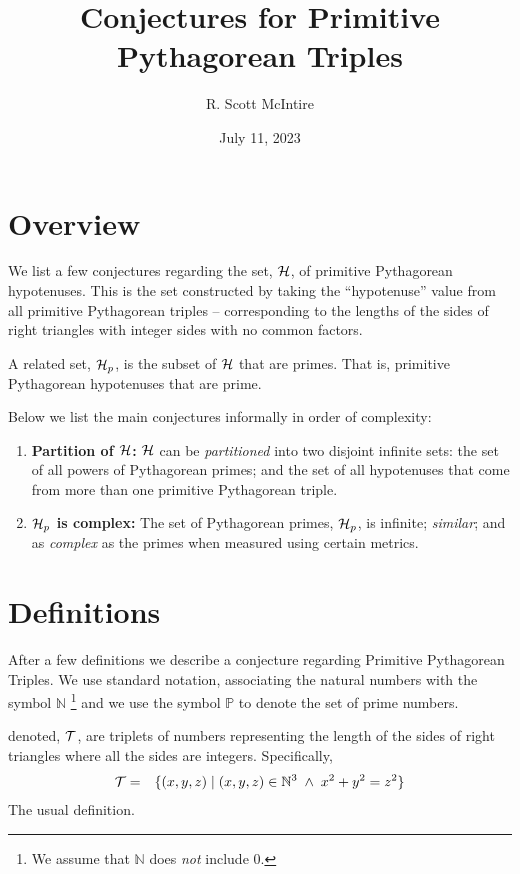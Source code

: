 \documentclass{article}
\title{Conjectures for Primitive Pythagorean Triples}
\author{R. Scott McIntire}
\date{July 11, 2023}
\theoremstyle{definition}
\begin{document}
\maketitle


\section{Overview}
We list a few conjectures regarding the set, ${\cal H}$, of primitive 
Pythagorean hypotenuses. This is the set constructed by taking the 
``hypotenuse'' value from all primitive Pythagorean triples -- corresponding 
to the lengths of the sides of right triangles with integer sides with 
no common factors.

A related set, ${\cal H}_p$, is the subset of ${\cal H}$ that are primes. 
That is, primitive Pythagorean hypotenuses that are prime.

Below we list the main conjectures informally in order of 
complexity:
\begin{enumerate}
  \item{{\bf Partition of ${\cal H}$:\/} ${\cal H}$ can be {\em partitioned\/} 
      into two disjoint infinite sets: 
    the set of all powers of Pythagorean primes; and the set of all 
        hypotenuses that come from more than one primitive Pythagorean triple.}
  \item{{\bf ${\cal H}_p$ is complex:\/} The set of Pythagorean primes, 
      ${\cal H}_p$, is infinite; {\em similar\/}; and as {\em complex\/} as 
        the primes when measured using certain metrics.}
\end{enumerate}


\section{Definitions}
After a few definitions we describe a conjecture regarding Primitive 
Pythagorean Triples. We use standard notation, associating the natural 
numbers with the symbol $\mathbb{N}$%
\footnote{We assume that $\mathbb{N}$ does {\em not\/} include $0$.}
and we use the symbol $\mathbb{P}$ to denote the set of prime numbers.


 denoted, ${\cal T}$, are  triplets of 
numbers representing the length of the sides of
right triangles where all the sides are integers. Specifically,
\begin{eqnarray}
  {\cal T} & = & \{ (x,y,z) \; | \; (x,y,z) \in \mathbb{N}^3 \; \wedge \; x^2 + y^2 = z^2 \}
\end{eqnarray}
The usual definition.
\end{document}
